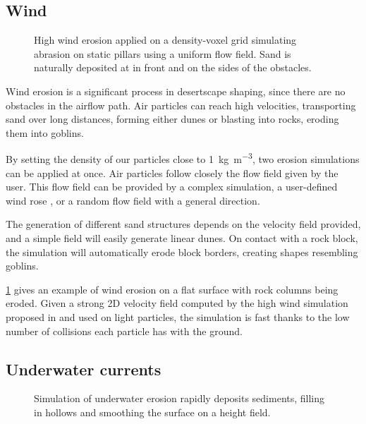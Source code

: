 \subsection{Wind}

\begin{figure}[H]
    \caption{High wind erosion applied on a density-voxel grid simulating abrasion on static pillars using a uniform flow field. Sand is naturally deposited at in front and on the sides of the obstacles.}
    \label{fig:erosion-results-wind}
\end{figure}

Wind erosion is a significant process in desertscape shaping, since there are no obstacles in the airflow path. Air particles can reach high velocities, transporting sand over long distances, forming either dunes or blasting into rocks, eroding them into goblins. 

By setting the density of our particles close to \SI{1}{\kilogram\per\cubic\meter}, two erosion simulations can be applied at once. Air particles follow closely the flow field given by the user. This flow field can be provided by a complex simulation, a user-defined wind rose \cite{Paris2019b}, or a random flow field with a general direction. 

The generation of different sand structures depends on the velocity field provided, and a simple field will easily generate linear dunes. On contact with a rock block, the simulation will automatically erode block borders, creating shapes resembling goblins. 

\cref{fig:erosion-results-wind} gives an example of wind erosion on a flat surface with rock columns being eroded. Given a strong 2D velocity field computed by the high wind simulation proposed in \cite{Paris2019b} and used on light particles, the simulation is fast thanks to the low number of collisions each particle has with the ground. 

\subsection{Underwater currents}

\begin{figure}[H]
    \caption{Simulation of underwater erosion rapidly deposits sediments, filling in hollows and smoothing the surface on a height field.}
    \label{fig:erosion-results-underwater}
\end{figure}

